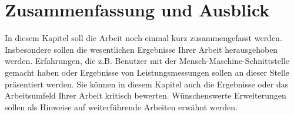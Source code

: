 \chapter{Zusammenfassung und Ausblick}

In diesem Kapitel soll die Arbeit noch einmal kurz zusammengefasst werden. Insbesondere sollen die wesentlichen Ergebnisse Ihrer Arbeit herausgehoben werden. Erfahrungen, die z.B. Benutzer mit der Mensch-Maschine-Schnittstelle gemacht haben oder Ergebnisse von Leistungsmessungen sollen an dieser Stelle präsentiert werden. Sie können in diesem Kapitel auch die Ergebnisse oder das Arbeitsumfeld Ihrer Arbeit kritisch bewerten. Wünschenswerte Erweiterungen sollen als Hinweise auf weiterführende Arbeiten erwähnt werden.
